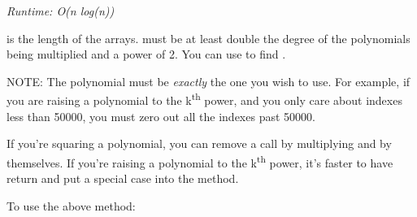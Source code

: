 
\textit{Runtime: O(n log(n))}

 is the length of the arrays.  must be at least double the degree of the polynomials being multiplied and a power of 2. You can use  to find .

NOTE: The polynomial must be \textit{exactly} the one you wish to use. For example, if you are raising a polynomial to the k\textsuperscript{th} power, and you only care about indexes less than 50000, you must zero out all the indexes past 50000.

If you're squaring a polynomial, you can remove a  call by multiplying  and  by themselves. If you're raising a polynomial to the k\textsuperscript{th} power, it's faster to have  return  and put a special case into the  method.



To use the above method:




\newpage